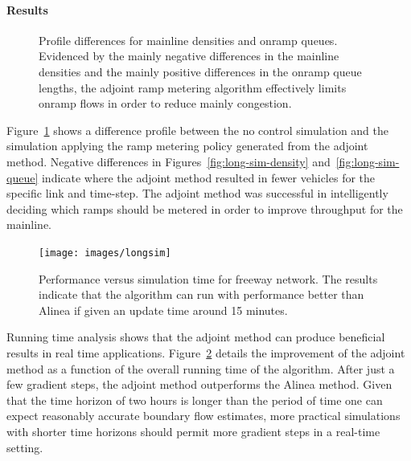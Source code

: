 \paragraph{Results}

\begin{figure}
\hfill{}

\caption{Profile differences for mainline densities and onramp queues. Evidenced
by the mainly negative differences in the mainline densities and the
mainly positive differences in the onramp queue lengths, the adjoint
ramp metering algorithm effectively limits onramp flows in order to
reduce mainly congestion.\label{fig:long-sim}}
\end{figure}


Figure~\ref{fig:long-sim} shows a difference profile between the
no control simulation and the simulation applying the ramp metering
policy generated from the adjoint method. Negative differences in
Figures~\ref{fig:long-sim-density} and~\ref{fig:long-sim-queue}
indicate where the adjoint method resulted in fewer vehicles for the
specific link and time-step. The adjoint method was successful in
intelligently deciding which ramps should be metered in order to improve
throughput for the mainline.
\begin{figure}
\begin{centering}
\texttt{[image: images/longsim]}
\par\end{centering}
\caption{Performance versus simulation time for freeway network. The results
indicate that the algorithm can run with performance better than Alinea
if given an update time around 15 minutes.}\label{fig:running-time}
\end{figure}


Running time analysis shows that the adjoint method can produce beneficial
results in real time applications. Figure~\ref{fig:running-time} details the improvement of the adjoint method as a function of the overall running time of the algorithm. After just a few gradient steps, the
adjoint method outperforms the Alinea method. Given that the time
horizon of two hours is longer than the period of time one can expect
reasonably accurate boundary flow estimates, more practical simulations
with shorter time horizons should permit more gradient steps in a
real-time setting.

